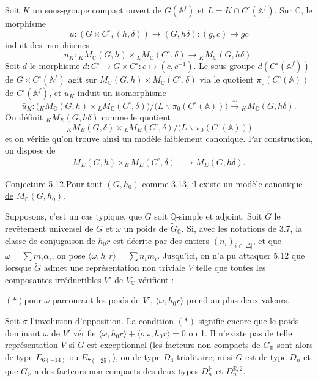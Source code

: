 \documentclass[10pt]{article}
\newcommand{\A}{\mathbb A}
\newcommand{\Af}{\mathbb A^f}
\newcommand{\C}{\mathbb C}
\newcommand{\Q}{\mathbb Q}
\newcommand{\R}{\mathbb R}
\newcommand{\MC}{M_{\C}}
\begin{document}
Soit $K$ un sous-groupe compact ouvert de $G(\Af)$ et $L=K\cap C^\circ(\Af)$. Sur $\C$, le morphisme
\[
u:(G\times C^\circ,(h,\delta))\longrightarrow(G,h\delta):(g,c)\longmapsto gc
\]
induit des morphismes
\[
u_K:{}_K\MC(G,h)\times {}_L\MC(C^\circ,\delta)
 \longrightarrow {}_K\MC(G,h\delta).
\]
Soit $d$ le morphisme $d:C^\circ\longrightarrow G\times C^\circ:c\longmapsto(c,c^{-1})$. Le sous-groupe $d(C^\circ(\Af))$ de $G\times C^\circ(\Af)$ agit sur $\MC(G,h)\times\MC(C^\circ,\delta)$ via le quotient $\pi_0(C^\circ(\A))$ de $C^\circ(\Af)$, et $u_K$ induit un isomorphisme
\[
\bar u_K:\bigl({}_K\MC(G,h)\times{}_L\MC(C^\circ,\delta)\bigr)/
\bigl(L\backslash\pi_0(C^\circ(\A))\bigr)
\xrightarrow{\sim}{}_K\MC(G,h\delta).
\]
On définit ${}_K M_E(G,h\delta)$ comme le quotient
\[
{}_K M_E(G,\delta)\times{}_L M_E(C^\circ,\delta)/
\bigl(L\backslash\pi_0(C^\circ(\A))\bigr)
\]
et on vérifie qu'on trouve ainsi un modèle faiblement canonique. Par construction, on dispose de\begingroup\makeatletter
\tagsleft@true\makeatother
\begin{align}
M_E(G,h)\times_E M_E(C^\circ,\delta)&\longrightarrow M_E(G,h\delta). \tag{5.11.1}
\end{align}\endgroup

\noindent \uline{Conjecture} 5.12.\quad \uline{Pour tout} $(G,h_0)$ \uline{comme} 3.13, \uline{il existe un modèle canonique de} $\MC(G,h_0)$.

Supposons, c'est un cas typique, que $G$ soit $\Q$-simple et adjoint. Soit $\widetilde G$ le revêtement universel de $G$ et $\omega$ un poids de $\widetilde G_{\C}$. Si, avec les notations de 3.7, la classe de conjugaison de $h_0r$ est décrite par des entiers $(n_i)_{i\in|\Delta|}$, et que $\omega=\sum m_i\alpha_i$, on pose $\langle\omega,h_0r\rangle=\sum n_i m_i$.
Jusqu'ici, on n'a pu attaquer 5.12 que lorsque $\widetilde G$ admet une représentation non triviale $V$ telle que toutes les composantes irréductibles $V'$ de $V_{\C}$ vérifient :

\noindent $(*)$\quad pour $\omega$ parcourant les poids de $V'$, $\langle\omega,h_0r\rangle$ prend au plus deux valeurs.

Soit $\sigma$ l'involution d'opposition. La condition $(*)$ signifie encore que le poids dominant $\omega$ de $V'$ vérifie $\langle\omega,h_0r\rangle+\langle\sigma\omega,h_0r\rangle=0$ ou 1. Il n'existe pas de telle représentation $V$ si $G$ est exceptionnel (les facteurs non compacts de $G_{\R}$ sont alors de type $E_{6(-14)}$ ou $E_{7(-25)}$), ou de type $D_4$ trialitaire, ni si $G$ est de type $D_n$ et que $G_{\R}$ a des facteurs non compacts des deux types $D_n^{\mathbb H}$ et $D_n^{\mathbb R,2}$.
\end{document}
